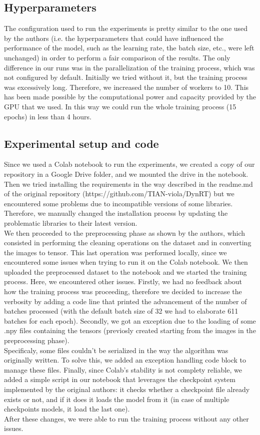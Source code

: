 \subsection{Hyperparameters}
The configuration used to run the experiments is pretty similar to the one used by the authors (i.e. the hyperparameters that could have influenced the performance of the model, such as the learning rate, the batch size, etc., were left unchanged) in order to perform a fair comparison of the results. The only difference in our runs was in the parallelization of the training process, which was not configured by default. Initially we tried without it, but the training process was excessively long. Therefore, we increased the number of workers to 10. This has been made possible by the computational power and capacity provided by the GPU that we used. In this way we could run the whole training process (15 epochs) in less than 4 hours. 

\subsection{Experimental setup and code}
Since we used a Colab notebook to run the experiments, we created a copy of our repository in a Google Drive folder, and we mounted the drive in the notebook. Then we tried installing the requirements in the way described in the readme.md of the original repository (https://github.com/TIAN-viola/DynRT) but we encountered some problems due to incompatible versions of some libraries. Therefore, we manually changed the installation process by updating the problematic libraries to their latest version. \\
We then proceeded to the preprocessing phase as shown by the authors, which consisted in performing the cleaning operations on the dataset and in converting the images to tensor. This last operation was performed locally, since we encountered some issues when trying to run it on the Colab notebook. We then uploaded the preprocessed dataset to the notebook and we started the training process. Here, we encountered other issues. Firstly, we had no feedback about how the training process was proceeding, therefore we decided to increase the verbosity by adding a code line that printed the advancement of the number of batches processed (with the default batch size of 32 we had to elaborate 611 batches for each epoch). Secondly, we got an exception due to the loading of some .npy files containing the tensors (previosly created starting from the images in the preprocessing phase). \\
Specificaly, some files couldn't be serialized in the way the algorithm was originally written. To solve this, we added an exception handling code block to manage these files. Finally, since Colab's stability is not complety reliable, we added a simple script in our notebook that leverages the checkpoint system implemented by the original authors: it checks whether a checkpoint file already exists or not, and if it does it loads the model from it (in case of multiple checkpoints models, it load the last one). \\
After these changes, we were able to run the training process without any other issues.


